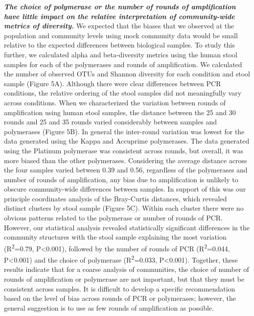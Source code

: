 \documentclass[11pt,]{article}
\begin{document}
\textbf{\emph{The choice of polymerase or the number of rounds of
amplification have little impact on the relative interpretation of
community-wide metrics of diversity.}} We expected that the biases that
we observed at the population and community levels using mock community
data would be small relative to the expected differences between
biological samples. To study this further, we calculated alpha and
beta-diversity metrics using the human stool samples for each of the
polymerases and rounds of amplification. We calculated the number of
observed OTUs and Shannon diversity for each condition and stool sample
(Figure 5A). Although there were clear differences between PCR
conditions, the relative ordering of the stool samples did not
meaningfully vary across conditions. When we characterized the variation
between rounds of amplification using human stool samples, the distance
between the 25 and 30 rounds and 25 and 35 rounds varied considerably
between samples and polymerases (Figure 5B). In general the inter-round
variation was lowest for the data generated using the Kappa and
Accuprime polymerases. The data generated using the Platinum polymerase
was consistent across rounds, but overall, it was more biased than the
other polymerases. Considering the average distance across the four
samples varied between 0.39 and 0.56, regardless of the polymerases and
number of rounds of amplification, any bias due to amplification is
unlikely to obscure community-wide differences between samples. In
support of this was our principle coordinates analysis of the
Bray-Curtis distances, which revealed distinct clusters by stool sample
(Figure 5C). Within each cluster there were no obvious patterns related
to the polymerase or number of rounds of PCR. However, our statistical
analysis revealed statistically significant differences in the community
structures with the stool sample explaining the most variation
(R\textsuperscript{2}=0.79, P\textless{}0.001), followed by the number
of rounds of PCR (R\textsuperscript{2}=0.044, P\textless{}0.001) and the
choice of polymerase (R\textsuperscript{2}=0.033, P\textless{}0.001).
Together, these results indicate that for a coarse analysis of
communities, the choice of number of rounds of amplification or
polymerase are not important, but that they must be consistent across
samples. It is difficult to develop a specific recommendation based on
the level of bias across rounds of PCR or polymerases; however, the
general suggestion is to use as few rounds of amplification as possible.
\end{document}
